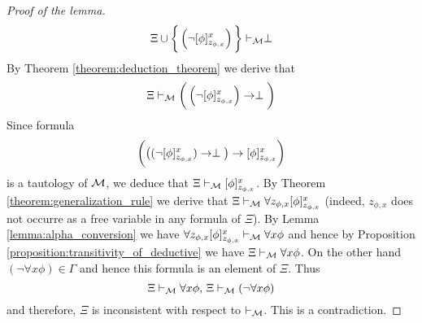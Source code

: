 \begin{proof}[Proof of the lemma]
$$\Xi \cup \bigg\{\left(\neg[\phi]^x_{z_{\phi,x}}\right)\bigg\} \vdash_{{\mathcal M}} \perp$$
By Theorem \ref{theorem:deduction_theorem} we derive that
$$\Xi \vdash_{{\mathcal M}} \bigg(\left(\neg[\phi]^x_{z_{\phi,x}}\right) \rightarrow \perp\bigg)$$
Since formula
$$\bigg (\big((\neg[\phi]^x_{z_{\phi,x}}) \rightarrow \perp \big) \rightarrow [\phi]^x_{z_{\phi,x}}\bigg)$$
is a tautology of ${\mathcal M}$, we deduce that $\Xi \vdash_{{\mathcal M}} [\phi]^x_{z_{\phi,x}}$. By Theorem \ref{theorem:generalization_rule} we derive that $\Xi \vdash_{{\mathcal M}} \forall z_{\phi,x} [\phi]^x_{z_{\phi,x}}$ (indeed, $z_{\phi,x}$ does not occurre as a free variable in any formula of $\Xi$). By Lemma \ref{lemma:alpha_conversion} we have $\forall z_{\phi,x} [\phi]^x_{z_{\phi,x}} \vdash_{{\mathcal M}} \forall x\phi$ and hence by Proposition \ref{proposition:transitivity_of_deductive} we have $\Xi \vdash_{{\mathcal M}} \forall x\phi$. On the other hand $(\neg\forall x\phi) \in \Gamma$ and hence this formula is an element of $\Xi$. Thus
$$\Xi \vdash_{{\mathcal M}} \forall x\phi,\, \Xi \vdash_{{\mathcal M}} (\neg\forall x\phi)$$
and therefore, $\Xi$ is inconsistent with respect to $\vdash_{{\mathcal M}}$. This is a contradiction.
\end{proof}

